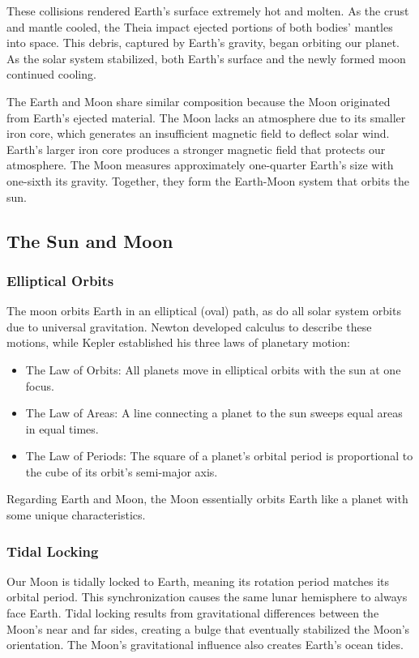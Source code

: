 \documentclass[12pt,oneside,a4paper,english]{article}
\begin{document}
These collisions rendered Earth's surface extremely hot and molten. As the crust and mantle cooled, the Theia impact ejected portions of both bodies' mantles into space. This debris, captured by Earth's gravity, began orbiting our planet. As the solar system stabilized, both Earth's surface and the newly formed moon continued cooling.

The Earth and Moon share similar composition because the Moon originated from Earth's ejected material. The Moon lacks an atmosphere due to its smaller iron core, which generates an insufficient magnetic field to deflect solar wind. Earth's larger iron core produces a stronger magnetic field that protects our atmosphere. The Moon measures approximately one-quarter Earth's size with one-sixth its gravity. Together, they form the Earth-Moon system that orbits the sun.

\subsection{The Sun and Moon}
\subsubsection{Elliptical Orbits}
The moon orbits Earth in an elliptical (oval) path, as do all solar system orbits due to universal gravitation. Newton developed calculus to describe these motions, while Kepler established his three laws of planetary motion:
\begin{itemize}
    \item The Law of Orbits: All planets move in elliptical orbits with the sun at one focus.
    \item The Law of Areas: A line connecting a planet to the sun sweeps equal areas in equal times.
    \item The Law of Periods: The square of a planet's orbital period is proportional to the cube of its orbit's semi-major axis.\cite{kepler}
\end{itemize}

Regarding Earth and Moon, the Moon essentially orbits Earth like a planet with some unique characteristics.

\subsubsection{Tidal Locking}
Our Moon is tidally locked to Earth, meaning its rotation period matches its orbital period. This synchronization causes the same lunar hemisphere to always face Earth. Tidal locking results from gravitational differences between the Moon's near and far sides, creating a bulge that eventually stabilized the Moon's orientation. The Moon's gravitational influence also creates Earth's ocean tides.
\end{document}
